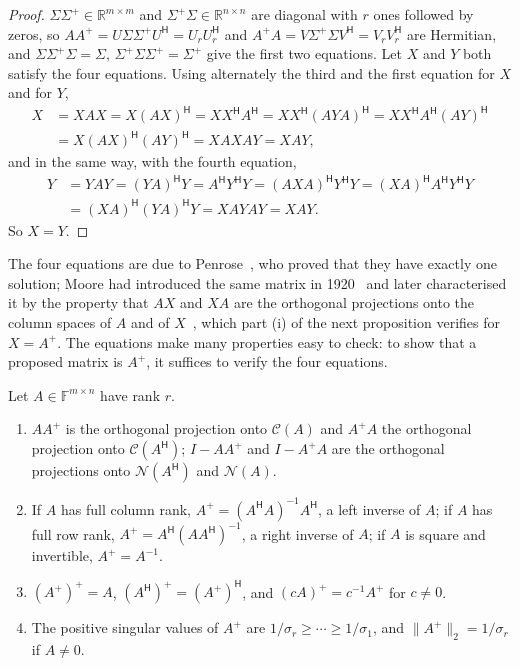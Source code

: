 \begin{proof}
$\Sigma\Sigma^+\in\mathbb R^{m\times m}$ and $\Sigma^+\Sigma\in\mathbb R^{n\times n}$ are diagonal with $r$ ones followed by zeros, so $AA^+=U\Sigma\Sigma^+U^{\mathsf H}=U_rU_r^{\mathsf H}$ and $A^+A=V\Sigma^+\Sigma V^{\mathsf H}=V_rV_r^{\mathsf H}$ are Hermitian, and $\Sigma\Sigma^+\Sigma=\Sigma$, $\Sigma^+\Sigma\Sigma^+=\Sigma^+$ give the first two equations. Let $X$ and $Y$ both satisfy the four equations. Using alternately the third and the first equation for $X$ and for $Y$,
\[
\begin{aligned}
X&=XAX=X(AX)^{\mathsf H}=XX^{\mathsf H}A^{\mathsf H}=XX^{\mathsf H}(AYA)^{\mathsf H}=XX^{\mathsf H}A^{\mathsf H}(AY)^{\mathsf H}\\
&=X(AX)^{\mathsf H}(AY)^{\mathsf H}=XAXAY=XAY ,
\end{aligned}
\]
and in the same way, with the fourth equation,
\[
\begin{aligned}
Y&=YAY=(YA)^{\mathsf H}Y=A^{\mathsf H}Y^{\mathsf H}Y=(AXA)^{\mathsf H}Y^{\mathsf H}Y=(XA)^{\mathsf H}A^{\mathsf H}Y^{\mathsf H}Y\\
&=(XA)^{\mathsf H}(YA)^{\mathsf H}Y=XAYAY=XAY .
\end{aligned}
\]
So $X=Y$.
\end{proof}

The four equations are due to Penrose~\cite{penrose1955}, who proved that they have exactly one solution; Moore had introduced the same matrix in 1920~\cite{moore1920} and later characterised it by the property that $AX$ and $XA$ are the orthogonal projections onto the column spaces of $A$ and of $X$~\cite{bengreville2003}, which part (i) of the next proposition verifies for $X=A^+$. The equations make many properties easy to check: to show that a proposed matrix is $A^+$, it suffices to verify the four equations.

\begin{proposition}
\label{prop:pinv-properties}
Let $A\in\mathbb F^{m\times n}$ have rank $r$.
\begin{enumerate}
\item $AA^+$ is the orthogonal projection onto $\mathcal C(A)$ and $A^+A$ the orthogonal projection onto $\mathcal C(A^{\mathsf H})$; $I-AA^+$ and $I-A^+A$ are the orthogonal projections onto $\mathcal N(A^{\mathsf H})$ and $\mathcal N(A)$.
\item If $A$ has full column rank, $A^+=(A^{\mathsf H}A)^{-1}A^{\mathsf H}$, a left inverse of $A$; if $A$ has full row rank, $A^+=A^{\mathsf H}(AA^{\mathsf H})^{-1}$, a right inverse of $A$; if $A$ is square and invertible, $A^+=A^{-1}$.
\item $(A^+)^+=A$, $(A^{\mathsf H})^+=(A^+)^{\mathsf H}$, and $(cA)^+=c^{-1}A^+$ for $c\ne0$.
\item The positive singular values of $A^+$ are $1/\sigma_r\ge\cdots\ge1/\sigma_1$, and $\|A^+\|_2=1/\sigma_r$ if $A\ne0$.
\end{enumerate}
\end{proposition}

